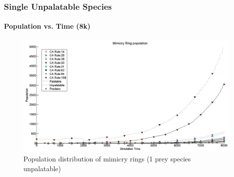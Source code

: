 \frame
{
	\frametitle{Single Unpalatable Species}
	\framesubtitle{Population vs. Time (8k)}

	\begin{figure}[H]
		\centering
		\includegraphics[scale=0.25]{../tex/images/simTime8k-1Prey-unp}
		\caption{Population distribution of mimicry rings (1 prey species unpalatable)}
		\label{fig:plot-1-prey-unp}
	\end{figure}

}

